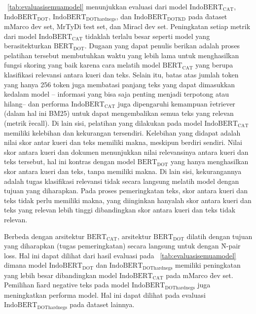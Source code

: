 \tab~\ref{tab:evaluasisemuamodel} menunjukkan evaluasi dari model $\text{IndoBERT}_{\text{CAT}}$, $\text{IndoBERT}_{\text{DOT}}$, $\text{IndoBERT}_{\text{DOThardnegs}}$, dan $\text{IndoBERT}_{\text{DOTKD}}$ pada \f{dataset} mMarco \f{dev set}, MrTyDi \f{test set}, dan Miracl \f{dev set}. Peningkatan setiap metrik dari model $\text{IndoBERT}_{\text{CAT}}$ tidaklah terlalu besar seperti model yang berasitekturkan $\text{BERT}_{\text{DOT}}$. Dugaan yang dapat penulis berikan adalah proses pelatihan tersebut membutuhkan waktu yang lebih lama untuk menghasilkan fungsi skoring yang baik karena cara melatih model $\text{BERT}_{\text{CAT}}$ yang berupa klasifikasi relevansi antara kueri dan teks. Selain itu, batas atas jumlah token yang hanya 256 token juga membatasi panjang teks yang dapat dimasukkan kedalam model -- informasi yang bisa saja penting menjadi terpotong atau hilang-- dan performa $\text{IndoBERT}_{\text{CAT}}$ juga dipengaruhi kemampuan \f{retriever} (dalam hal ini BM25) untuk dapat mengembalikan semua teks yang relevan (metrik \f{recall}). Di lain sisi, pelatihan yang dilakukan pada model $\text{IndoBERT}_{\text{CAT}}$ memiliki kelebihan dan kekurangan tersendiri. Kelebihan yang didapat adalah nilai skor antar kueri dan teks memiliki makna, meskipun berdiri sendiri. Nilai skor antara kueri dan dokumen menunjukkan nilai relevansinya antara kueri dan teks tersebut, hal ini kontras dengan model $\text{BERT}_{\text{DOT}}$ yang hanya menghasilkan skor antara kueri dan teks, tanpa memiliki makna. Di lain sisi, kekurangannya adalah tugas klasifikasi relevansi tidak secara langsung melatih model dengan tujuan yang diharapkan. Pada proses pemeringkatan teks, skor antara kueri dan teks tidak perlu memiliki makna, yang diinginkan hanyalah skor antara kueri dan teks yang relevan lebih tinggi dibandingkan skor antara kueri dan teks tidak relevan. 

Berbeda dengan arsitektur $\text{BERT}_{\text{CAT}}$, arsitektur $\text{BERT}_{\text{DOT}}$ dilatih dengan tujuan yang diharapkan (tugas pemeringkatan) secara langsung untuk dengan \f{N-pair loss}. Hal ini dapat dilihat dari hasil evaluasi pada \tab~\ref{tab:evaluasisemuamodel} dimana model $\text{IndoBERT}_{\text{DOT}}$ dan $\text{IndoBERT}_{\text{DOThardnegs}}$ memiliki peningkatan yang lebih besar dibandingkan model $\text{IndoBERT}_{\text{CAT}}$ pada mMarco \f{dev set}. Pemilihan \f{hard negative} teks pada model $\text{IndoBERT}_{\text{DOThardnegs}}$ juga meningkatkan performa model. Hal ini dapat dilihat pada evaluasi $\text{IndoBERT}_{\text{DOThardnegs}}$ pada \f{dataset} lainnya.

